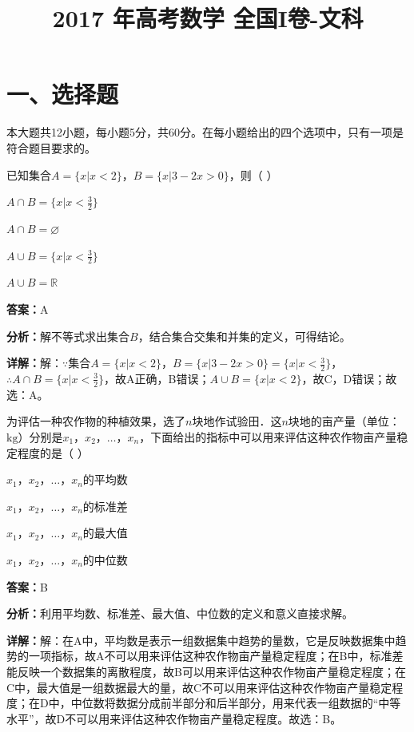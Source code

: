 ﻿\title{2017 年高考数学 全国I卷-文科}
\date{}
\maketitle

\section*{一、选择题}
本大题共12小题，每小题5分，共60分。在每小题给出的四个选项中，只有一项是符合题目要求的。

\begin{question}[points=5]
已知集合$A=\{x|x<2\}$，$B=\{x|3-2x>0\}$，则（        ）
\begin{choices}
  \item $A\cap B=\{x|x<\frac{3}{2}\}$
  \item $A\cap B=\varnothing$
  \item $A\cup B=\{x|x<\frac{3}{2}\}$
  \item $A\cup B=\mathbb{R}$
\end{choices}
\begin{solution}
\textbf{答案：}A

\textbf{分析：}解不等式求出集合$B$，结合集合交集和并集的定义，可得结论。

\textbf{详解：}解：$\because$集合$A=\{x|x<2\}$，$B=\{x|3-2x>0\}=\{x|x<\frac{3}{2}\}$，$\therefore A\cap B=\{x|x<\frac{3}{2}\}$，故A正确，B错误；$A\cup B=\{x|x<2\}$，故C，D错误；故选：A。
\end{solution}
\end{question}

\begin{question}[points=5]
为评估一种农作物的种植效果，选了$n$块地作试验田．这$n$块地的亩产量（单位：$\text{kg}$）分别是$x_1$，$x_2$，$\ldots$，$x_n$，下面给出的指标中可以用来评估这种农作物亩产量稳定程度的是（           ）
\begin{choices}
  \item $x_1$，$x_2$，$\ldots$，$x_n$的平均数
  \item $x_1$，$x_2$，$\ldots$，$x_n$的标准差
  \item $x_1$，$x_2$，$\ldots$，$x_n$的最大值
  \item $x_1$，$x_2$，$\ldots$，$x_n$的中位数
\end{choices}
\begin{solution}
\textbf{答案：}B

\textbf{分析：}利用平均数、标准差、最大值、中位数的定义和意义直接求解。

\textbf{详解：}解：在A中，平均数是表示一组数据集中趋势的量数，它是反映数据集中趋势的一项指标，故A不可以用来评估这种农作物亩产量稳定程度；在B中，标准差能反映一个数据集的离散程度，故B可以用来评估这种农作物亩产量稳定程度；在C中，最大值是一组数据最大的量，故C不可以用来评估这种农作物亩产量稳定程度；在D中，中位数将数据分成前半部分和后半部分，用来代表一组数据的“中等水平”，故D不可以用来评估这种农作物亩产量稳定程度。故选：B。
\end{solution}
\end{question}

